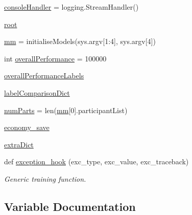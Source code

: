 \begin{DoxyCompactItemize}
\item 
\hyperlink{namespaceSAM_1_1SAM__Core_1_1trainSAMModel_a304aac71072fe2e3a2d39f8aab4e4c78}{console\+Handler} = logging.\+Stream\+Handler()
\item 
\hyperlink{namespaceSAM_1_1SAM__Core_1_1trainSAMModel_aa105ba4fe5c01efd4e10f0b17e51cd5b}{root}
\item 
\hyperlink{namespaceSAM_1_1SAM__Core_1_1trainSAMModel_afc2414cf44fd68b8bfe50896cca60315}{mm} = initialise\+Models(sys.\+argv\mbox{[}1\+:4\mbox{]}, sys.\+argv\mbox{[}4\mbox{]})
\item 
int \hyperlink{namespaceSAM_1_1SAM__Core_1_1trainSAMModel_ab5021bf6fb77308233bbc3595f77294d}{overall\+Performance} = 100000
\item 
\hyperlink{namespaceSAM_1_1SAM__Core_1_1trainSAMModel_a95f48ae2ace4025d7c9486bca0b71c0a}{overall\+Performance\+Labels}
\item 
\hyperlink{namespaceSAM_1_1SAM__Core_1_1trainSAMModel_aff84352e7940cc88f892f75360a6a54d}{label\+Comparison\+Dict}
\item 
\hyperlink{namespaceSAM_1_1SAM__Core_1_1trainSAMModel_a8cc79c923d6b6bed5dbdf3edfcdda00a}{num\+Parts} = len(\hyperlink{namespaceSAM_1_1SAM__Core_1_1trainSAMModel_afc2414cf44fd68b8bfe50896cca60315}{mm}\mbox{[}0\mbox{]}.participant\+List)
\item 
\hyperlink{namespaceSAM_1_1SAM__Core_1_1trainSAMModel_aff2733efcc99e07335dd4a963cf3b96c}{economy\+\_\+save}
\item 
\hyperlink{namespaceSAM_1_1SAM__Core_1_1trainSAMModel_a96bff06ae8a3e34fd235450c5df446ab}{extra\+Dict}
\item 
def \hyperlink{group__icubclient__SAM__Core_gab9063d062c168b9c621a28ab469ae1f9}{exception\+\_\+hook} (exc\+\_\+type, exc\+\_\+value, exc\+\_\+traceback)
\begin{DoxyCompactList}\small\item\em Generic training function. \end{DoxyCompactList}\end{DoxyCompactItemize}


\subsection{Variable Documentation}
\mbox{\label{namespaceSAM_1_1SAM__Core_1_1trainSAMModel_a6de46d6299824b843c610668a3d4e3d0}} 
